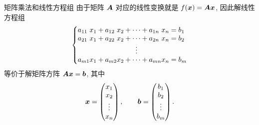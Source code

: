 \begin{frame}{矩阵乘法和线性方程组}
	\onslide<+->
	由于矩阵 ${\boldsymbol{A}}$ 对应的线性变换就是 $f({\boldsymbol{x}})={\boldsymbol{A}}{\boldsymbol{x}}$,
	\onslide<+->
	因此解线性方程组
	\[\laeq[lclcclcl]{
		a_{11}&x_1+{}&a_{12}&x_2&{}+\cdots+{}&a_{1n}&x_n={}&b_1\\
		a_{21}&x_1+{}&a_{22}&x_2&{}+\cdots+{}&a_{2n}&x_n={}&b_2\\
		&&&&\vdots&&&\\
		a_{m1}&x_1+{}&a_{m2}&x_2&{}+\cdots+{}&a_{mn}&x_n={}&b_m
	}\]
	\onslide<+->
	等价于解矩阵方阵 \alert{${\boldsymbol{A}}{\boldsymbol{x}}={\boldsymbol{b}}$}, 其中
	\[{\boldsymbol{x}}=\begin{pmatrix}
		x_1\\x_2\\\vdots\\x_n
	\end{pmatrix},\qquad
	{\boldsymbol{b}}=\begin{pmatrix}
		b_1\\b_2\\\vdots\\b_m
	\end{pmatrix}.\]
\end{frame}


